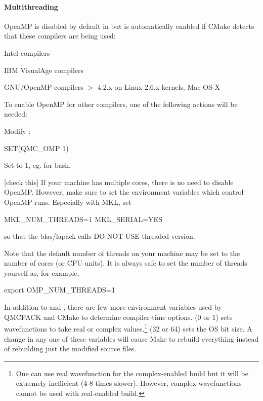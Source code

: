 \paragraph{Multithreading}
OpenMP is disabled by default in  but is automatically enabled if CMake detects that these compilers are being used:
\begin{itemize*}
  \item{} Intel compilers
  \item{} IBM VisualAge compilers
  \item{} GNU/OpenMP compilers $>$ 4.2.x on Linux 2.6.x kernels, Mac OS X 
\end{itemize*}
To enable OpenMP for other compilers, one of the following actions will be needed:
\begin{itemize*}
  \item{} Modify :
\begin{code}
SET(QMC_OMP 1)
\end{code}
  \item{} Set  to 1, eg.  for bash.
\end{itemize*}

[check this] If your machine has multiple cores, there is no need to disable OpenMP.  However, make sure to set the environment variables which control OpenMP runs.  Especially with MKL, set
\begin{code}
MKL_NUM_THREADS=1
MKL_SERIAL=YES
\end{code}
so that the blas/lapack calls DO NOT USE threaded version.

Note that the default number of threads on your machine may be set to the number of cores (or CPU units). It is always safe to set the number of threads yourself as, for example,
\begin{code}
export OMP_NUM_THREADS=1
\end{code}

In addition to  and , there are few more environment variables used by QMCPACK and CMake to determine compiler-time options.  (0 or 1) sets wavefunctions to take real or complex values.\footnote{One can use real wavefunction for the complex-enabled build but it will be extremely inefficient (4-8 times slower). However, complex wavefunctions cannot be used with real-enabled build.}   (32 or 64) sets the OS bit size.  A change in any one of these variables will cause Make to rebuild everything instead of rebuilding just the modified source files.

